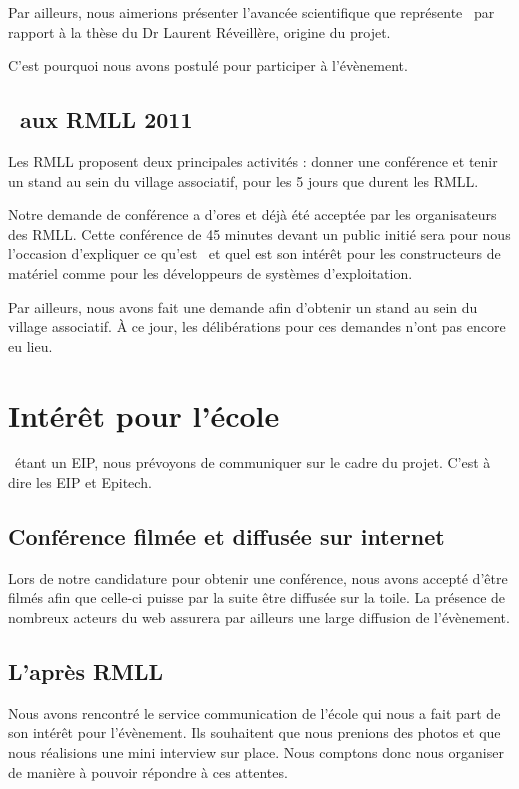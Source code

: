 \documentclass{rtxreport}
\begin{document}
Par ailleurs, nous aimerions présenter l'avancée scientifique que représente
\rtx\ par rapport à la thèse du Dr Laurent Réveillère, origine du projet.

C'est pourquoi nous avons postulé pour participer à l'évènement.


\section{\rtx\ aux RMLL 2011}

Les RMLL proposent deux principales activités : donner une conférence et tenir
un stand au sein du village associatif, pour les 5 jours que durent les RMLL.

Notre demande de conférence a d'ores et déjà été acceptée par les organisateurs
des RMLL. Cette conférence de 45 minutes devant un public initié sera pour
nous l'occasion d'expliquer ce qu'est \rtx\ et quel est son intérêt pour les
constructeurs de matériel comme pour les développeurs de systèmes
d'exploitation.

Par ailleurs, nous avons fait une demande afin d'obtenir un stand au sein du
village associatif. À ce jour, les délibérations pour ces demandes n'ont pas
encore eu lieu.


\chapter{Intérêt pour l'école}

\rtx\ étant un EIP, nous prévoyons de communiquer sur le cadre du projet. C'est
à dire les EIP et Epitech.

\section{Conférence filmée et diffusée sur internet}

Lors de notre candidature pour obtenir une conférence, nous avons accepté
d'être filmés afin que celle-ci puisse par la suite être diffusée sur la toile.
La présence de nombreux acteurs du web assurera par ailleurs une large
diffusion de l'évènement.

\section{L'après RMLL}

Nous avons rencontré le service communication de l'école qui nous a fait part
de son intérêt pour l'évènement. Ils souhaitent que nous prenions des photos et
que nous réalisions une mini interview sur place. Nous comptons donc nous
organiser de manière à pouvoir répondre à ces attentes.
\end{document}
